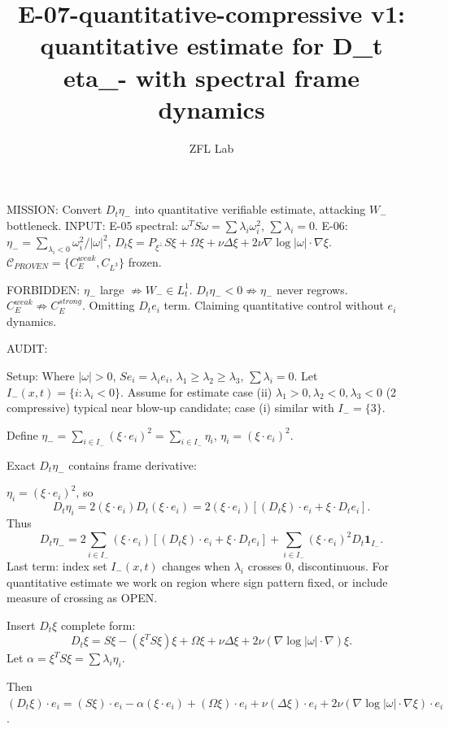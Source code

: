 \documentclass[11pt]{article}
\title{E-07-quantitative-compressive v1: quantitative estimate for D\_t eta\_- with spectral frame dynamics}
\author{ZFL Lab}
\begin{document}
\maketitle

MISSION: Convert $D_t\eta_-$ into quantitative verifiable estimate, attacking $W_-$ bottleneck.
INPUT: E-05 spectral: $\omega^T S\omega=\sum\lambda_i\omega_i^2$, $\sum\lambda_i=0$. E-06: $\eta_-=\sum_{\lambda_i<0}\omega_i^2/|\omega|^2$, $D_t\xi=P_{\xi^\perp}S\xi+\Omega\xi+\nu\Delta\xi+2\nu\nabla\log|\omega|\cdot\nabla\xi$. $\mathcal{C}_{PROVEN}=\{C_E^{weak},C_{L^3}\}$ frozen.

FORBIDDEN:
$\eta_-$ large $\not\Rightarrow W_-\in L^1_t$.
$D_t\eta_-<0\not\Rightarrow\eta_-$ never regrows.
$C_E^{weak}\not\Rightarrow C_E^{strong}$.
Omitting $D_t e_i$ term.
Claiming quantitative control without $e_i$ dynamics.

AUDIT:

Setup: Where $|\omega|>0$, $S e_i=\lambda_i e_i$, $\lambda_1\ge\lambda_2\ge\lambda_3$, $\sum\lambda_i=0$. Let $I_-(x,t)=\{i:\lambda_i<0\}$. Assume for estimate case (ii) $\lambda_1>0,\lambda_2<0,\lambda_3<0$ (2 compressive) typical near blow-up candidate; case (i) similar with $I_-=\{3\}$.

Define $\eta_-= \sum_{i\in I_-} (\xi\cdot e_i)^2 = \sum_{i\in I_-}\eta_i$, $\eta_i=(\xi\cdot e_i)^2$.

Exact $D_t\eta_-$ contains frame derivative:

$\eta_i = (\xi\cdot e_i)^2$, so
\begin{equation*}
D_t\eta_i =2(\xi\cdot e_i) D_t(\xi\cdot e_i)=2(\xi\cdot e_i)[(D_t\xi)\cdot e_i + \xi\cdot D_t e_i].
\end{equation*}
Thus
\begin{equation*}
\boxed{D_t\eta_- =2\sum_{i\in I_-}(\xi\cdot e_i)[(D_t\xi)\cdot e_i + \xi\cdot D_t e_i] + \sum_{i\in I_-}(\xi\cdot e_i)^2 D_t\mathbf{1}_{I_-}}.
\end{equation*}
Last term: index set $I_-(x,t)$ changes when $\lambda_i$ crosses 0, discontinuous. For quantitative estimate we work on region where sign pattern fixed, or include measure of crossing as OPEN.

Insert $D_t\xi$ complete form:
\begin{equation*}
D_t\xi = S\xi-(\xi^T S\xi)\xi + \Omega\xi + \nu\Delta\xi +2\nu(\nabla\log|\omega|\cdot\nabla)\xi.
\end{equation*}
Let $\alpha=\xi^T S\xi=\sum\lambda_i\eta_i$.

Then $(D_t\xi)\cdot e_i = (S\xi)\cdot e_i -\alpha(\xi\cdot e_i) + (\Omega\xi)\cdot e_i + \nu(\Delta\xi)\cdot e_i +2\nu(\nabla\log|\omega|\cdot\nabla\xi)\cdot e_i$.
\end{document}
